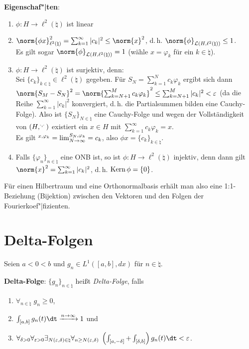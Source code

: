\textbf{Eigenschaf"|ten}:
\begin{enumerate}
    \item
    $\phi\colon H \rightarrow \ell^2(\natural)$ ist linear

    \item
    $\norm{\phi x}_{\ell^2(\natural)}^2 =
    \sum_{k=1}^\infty |c_k|^2 \le \norm{x}^2$,
    d.\,h. $\norm{\phi}_{\L(H, \ell^2(\natural))} \le 1$.\\
    Es gilt sogar $\norm{\phi}_{\L(H, \ell^2(\natural))} = 1$
    (wähle $x = \varphi_k$ für ein $k \in \natural$).

    \item
    $\phi\colon H \rightarrow \ell^2(\natural)$ ist surjektiv, denn:\\
    Sei $\{c_k\}_{k \in \natural} \in \ell^2(\natural)$ gegeben.
    Für $S_N = \sum_{k=1}^N c_k \varphi_k$ ergibt sich dann\\
    $\norm{S_M - S_N}^2 = \norm{\sum_{k=N+1}^M c_k \varphi_k}^2 \le
    \sum_{k=N+1}^M |c_k|^2 < \varepsilon$
    (da die Reihe $\sum_{k=1}^\infty |c_k|^2$ konvergiert, d.\,h. die
    Partialsummen bilden eine Cauchy-Folge).
    Also ist $\{S_N\}_{N \in \natural}$ eine Cauchy-Folge und wegen der
    Vollständigkeit von $(H, \sp{\cdot, \cdot})$ existiert ein $x \in H$ mit
    $\sum_{k=1}^\infty c_k \varphi_k = x$.\\
    Es gilt $\sp{x, \varphi_k} =
    \lim_{N \to \infty} \sp{S_N, \varphi_k} = c_k$, also
    $\phi x = \{c_k\}_{k \in \natural}$.

    \item
    Falls $\{\varphi_n\}_{n \in \natural}$ eine ONB ist, so ist
    $\phi\colon H \rightarrow \ell^2(\natural)$ injektiv, denn dann gilt\\
    $\norm{x}^2 = \sum_{k=1}^\infty |c_k|^2$, d.\,h.
    $\operatorname{Kern} \phi = \{0\}$.
\end{enumerate}

Für einen Hilbertraum und eine Orthonormalbasis erhält man also eine
1:1-Beziehung (Bijektion) zwischen den Vektoren und den Folgen der
Fourierkoef"|fizienten.

\section{%
    Delta-Folgen%
}

Seien $a < 0 < b$ und $g_n \in L^1([a, b], dx)$ für $n \in \natural$.

\textbf{Delta-Folge}:
$\{g_n\}_{n \in \natural}$ heißt \emph{Delta-Folge}, falls
\begin{enumerate}
    \item
    $\forall_{n \in \natural}\; g_n \ge 0$,

    \item
    $\int_{[a, b]} g_n(t)\dt \xrightarrow{n \to \infty} 1$ und

    \item
    $\forall_{\delta > 0} \forall_{\varepsilon > 0}
    \exists_{N(\varepsilon, \delta) \in \natural}
    \forall_{n \ge N(\varepsilon, \delta)}\;
    \left(\int_{[a, -\delta]} + \int_{[\delta, b]}\right)
    g_n(t) \dt < \varepsilon$.
\end{enumerate}

